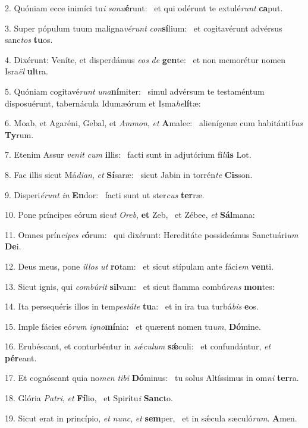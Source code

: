 2. Quóniam ecce inimíci tu\textit{i} \textit{so}\textit{nu}\textbf{é}runt: \ast\  et qui odérunt te extulé\textit{runt} \textbf{ca}put.\

3. Super pópulum tuum maligna\textit{vé}\textit{runt} \textit{con}\textbf{sí}lium: \ast\  et cogitavérunt advérsus sanc\textit{tos} \textbf{tu}os.\

4. Dixérunt: Veníte, et disperdámus \textit{e}\textit{os} \textit{de} \textbf{gen}te: \ast\  et non memorétur nomen Isra\textit{ël} \textbf{ul}tra.\

5. Quóniam cogitavé\textit{runt} \textit{u}\textit{na}\textbf{ní}miter: \ast\  simul advérsum te testaméntum disposuérunt, tabernácula Idumæórum et Isma\textit{he}\textbf{lí}tæ:\

6. Moab, et Agaréni, Gebal, et \textit{Am}\textit{mon}, \textit{et} \textbf{A}malec: \ast\  alienígenæ cum habitánti\textit{bus} \textbf{Ty}rum.\

7. Etenim Assur \textit{ve}\textit{nit} \textit{cum} \textbf{il}lis: \ast\  facti sunt in adjutórium fí\textit{li}\textbf{is} Lot.\

8. Fac illis sicut Má\textit{di}\textit{an}, \textit{et} \textbf{Sí}saræ: \ast\  sicut Jabin in torrén\textit{te} \textbf{Cis}son.\

9. Disperi\textit{é}\textit{runt} \textit{in} \textbf{En}dor: \ast\  facti sunt ut ster\textit{cus} \textbf{ter}ræ.\

10. Pone príncipes eórum sic\textit{ut} \textit{O}\textit{reb}, \textbf{et} Zeb, \ast\  et Zébee, \textit{et} \textbf{Sál}mana:\

11. Omnes prín\textit{ci}\textit{pes} \textit{e}\textbf{ó}rum: \ast\  qui dixérunt: Hereditáte possideámus Sanctuári\textit{um} \textbf{De}i.\

12. Deus meus, pone \textit{il}\textit{los} \textit{ut} \textbf{ro}tam: \ast\  et sicut stípulam ante fáci\textit{em} \textbf{ven}ti.\

13. Sicut ignis, qui \textit{com}\textit{bú}\textit{rit} \textbf{sil}vam: \ast\  et sicut flamma combú\textit{rens} \textbf{mon}tes:\

14. Ita persequéris illos in tem\textit{pes}\textit{tá}\textit{te} \textbf{tu}a: \ast\  et in ira tua turbá\textit{bis} \textbf{e}os.\

15. Imple fácies eó\textit{rum} \textit{i}\textit{gno}\textbf{mí}nia: \ast\  et quærent nomen tu\textit{um}, \textbf{Dó}mine.\

16. Erubéscant, et conturbéntur in \textit{sǽ}\textit{cu}\textit{lum} \textbf{sǽ}culi: \ast\  et confundántur, \textit{et} \textbf{pér}eant.\

17. Et cognóscant quia no\textit{men} \textit{ti}\textit{bi} \textbf{Dó}minus: \ast\  tu solus Altíssimus in om\textit{ni} \textbf{ter}ra.\

18. Glória \textit{Pa}\textit{tri}, \textit{et} \textbf{Fí}lio, \ast\  et Spirítu\textit{i} \textbf{Sanc}to.\

19. Sicut erat in princípio, \textit{et} \textit{nunc}, \textit{et} \textbf{sem}per, \ast\  et in sǽcula sæculó\textit{rum}. \textbf{A}men.\


